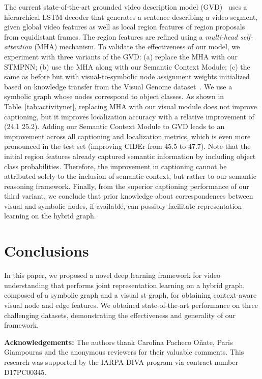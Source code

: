 \documentclass[runningheads]{llncs}
\begin{document}
The current state-of-the-art grounded video description model (GVD)~\cite{Zhou:CVPR19} uses a hierarchical LSTM decoder that generates a sentence describing a video segment, given global video features as well as local region features of  region proposals from  equidistant frames. The region features are refined using a \emph{multi-head self-attention} (MHA) mechanism. To validate the effectiveness of our model, we experiment with three variants of the GVD: (a) replace the MHA with our \ac{STMPNN}; (b) use the MHA along with our Semantic Context Module; (c) the same as before but with visual-to-symbolic node assignment weights initialized based on knowledge transfer from the Visual Genome dataset~\cite{Krishna:IJCV17}. We use a symbolic graph whose nodes correspond to object classes. As shown in Table~\ref{tab:activitynet}, replacing MHA with our visual module does not improve captioning, but it improves localization accuracy with a relative improvement of  (24.1  25.2). Adding our Semantic Context Module to GVD leads to an improvement across all captioning and localization metrics, which is even more pronounced in the test set (improving CIDEr from 45.5 to 47.7). Note that the initial region features already captured semantic information by including object class probabilities. Therefore, the improvement in captioning cannot be attributed solely to the inclusion of semantic context, but rather to our semantic reasoning framework. Finally, from the superior captioning performance of our third variant, we conclude that prior knowledge about correspondences between visual and symbolic nodes, if available, can possibly facilitate representation learning on the hybrid graph. \section{Conclusions}
\label{sec:conclusions}
In this paper, we proposed a novel deep learning framework for video understanding that performs joint representation learning on a hybrid graph, composed of a symbolic graph and a visual st-graph, for obtaining context-aware visual node and edge features.  We obtained state-of-the-art performance on three challenging datasets, demonstrating the effectiveness and generality of our framework. 

 

\smallskip\noindent\textbf{Acknowledgements:}
The authors thank Carolina Pacheco O\~nate, Paris Giampouras 
and the anonymous reviewers for their valuable comments. This research was 
supported by the IARPA DIVA program via contract number D17PC00345.
 

\end{document}
